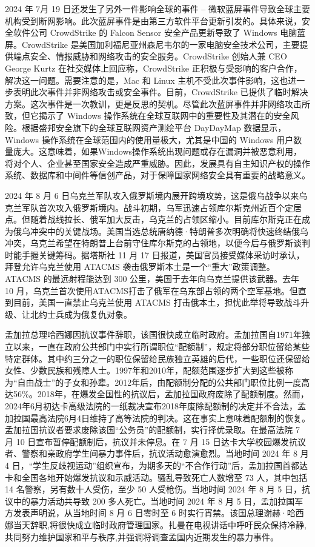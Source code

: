 2024 年 7月 19 日还发生了另外一件影响全球的事件 -- 微软蓝屏事件导致全球主要机构受到断网影响。此次蓝屏事件是由第三方软件平台更新引发的。具体来说，安全软件公司 CrowdStrike 的 Falcon Sensor 安全产品更新导致了 Windows 电脑蓝屏。CrowdStrike 是美国加利福尼亚州森尼韦尔的一家电脑安全技术公司，主要提供端点安全、情报威胁和网络攻击的安全服务。CrowdStrike 创始人兼 CEO George Kurtz 在社交媒体上回应称，CrowdStrike 正积极与受影响的客户合作，解决这一问题。需要注意的是，Mac 和 Linux 主机不受此次事件影响，这也进一步表明此次事件并非网络攻击或安全事件。目前，CrowdStrike 已提供了临时解决方案。这次事件是一次教训，更是反思的契机。尽管此次蓝屏事件并非网络攻击所致，但它揭示了 Windows 操作系统在全球互联网中的重要性及其潜在的安全风险。根据盛邦安全旗下的全球互联网资产测绘平台 DayDayMap 数据显示，Windows 操作系统在全球范围内的使用量极大，尤其是中国的 Windows 用户数量庞大。这意味着，如果Windows操作系统出现问题或存在漏洞并被恶意利用，将对个人、企业甚至国家安全造成严重威胁。因此，发展具有自主知识产权的操作系统、数据库和中间件等信创产品，对于保障国家网络安全具有重要的战略意义。

2024 年 8 月 6 日乌克兰军队攻入俄罗斯境内展开跨境攻势，这是俄乌战争以来乌克兰军队首次攻入俄罗斯境内。战斗初期，乌军迅速占领库尔斯克州近百个定居点。但随着战线拉长、俄军加大反击，乌克兰的占领区缩小。目前库尔斯克正在成为俄乌冲突中的关键战场。美国当选总统唐纳德·特朗普多次明确将快速终结俄乌冲突，乌克兰希望在特朗普上台前守住库尔斯克的占领地，以便今后与俄罗斯谈判时能手握关键筹码。据塔斯社 11 月 17 日报道，美国官员接受媒体采访时承认，拜登允许乌克兰使用 ATACMS 袭击俄罗斯本土是一个“重大”政策调整。ATACMS 的最远射程能达到 300 公里，美国于去年向乌克兰提供该武器。去年 10 月，乌克兰首次使用ATACMS打击了俄军在乌东部占领的两个空军基地。但直到目前，美国一直禁止乌克兰使用 ATACMS 打击俄本土，担忧此举将导致战斗升级、让北约士兵成为俄复仇对象。

孟加拉总理哈西娜因抗议事件辞职，该国很快成立临时政府。孟加拉国自1971年独立以来，一直在政府公共部门中实行所谓职位“配额制”，规定将部分职位留给某些特定群体。其中约三分之一的职位保留给民族独立英雄的后代，一些职位还保留给女性、少数民族和残障人士。1997年和2010年，配额范围逐步扩大到这些被称为“自由战士”的子女和孙辈。2012年后，由配额制分配的公共部门职位比例一度高达56\%。2018年，在爆发全国性的抗议后，孟加拉国政府废除了配额制度。然而，2024年6月初达卡高级法院的一纸裁决宣布2018年废除配额制的决定并不合法，孟加拉国最高法院6月4日维持了高等法院的判决。这在事实上意味着配额制的恢复。孟加拉国抗议者要求废除该国“公务员”的配额制，实行择优录取。在最高法院 7 月 10 日宣布暂停配额制后，抗议并未停息。在 7 月 15 日达卡大学校园爆发抗议者、警察和亲政府学生间暴力事件后，抗议活动愈演愈烈。当地时间 2024 年 8 月 4 日，“学生反歧视运动”组织宣布，为期多天的“不合作行动”后，孟加拉国首都达卡和全国各地开始爆发抗议和示威活动。骚乱导致死亡人数增至 73 人，其中包括 14 名警察，另有数十人受伤，至少 50 人受枪伤。当地时间 2024 年 8 月 5 日，抗议中的暴力活动共导致 200 多人死亡。当地时间 2024 年 8 月 5 日，孟加拉国军方发表声明说，从当地时间 8 月 6 日零时至 6 时实行宵禁。该国总理谢赫·哈西娜当天辞职,将很快成立临时政府管理国家。扎曼在电视讲话中呼吁民众保持冷静,共同努力维护国家和平与秩序,并强调将调查孟国内近期发生的暴力事件。


